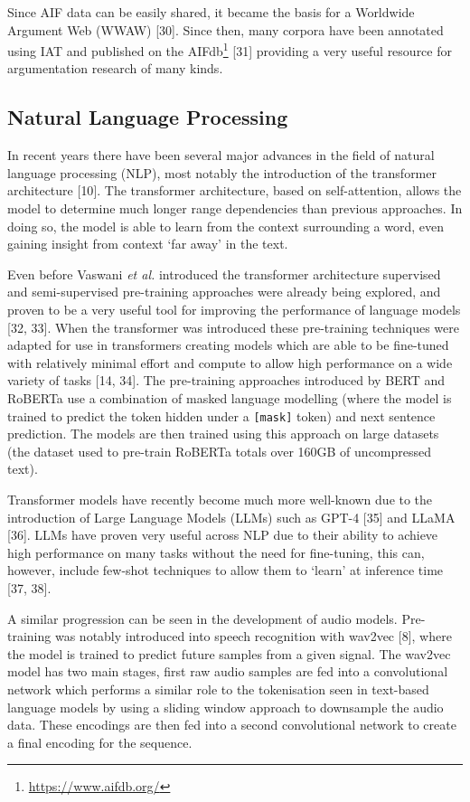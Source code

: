 \documentclass[twocolumn,twoside]{article}
\begin{document}
Since AIF data can be easily shared, it became the basis for a Worldwide
Argument Web (WWAW) {[}30{]}. Since then, many corpora have been
annotated using IAT and published on the AIFdb\footnote{\url{https://www.aifdb.org/}}
{[}31{]} providing a very useful resource for argumentation research of
many kinds.

\subsection{Natural Language Processing}\label{sec:background-ml}

In recent years there have been several major advances in the field of
natural language processing (NLP), most notably the introduction of the
transformer architecture {[}10{]}. The transformer architecture, based
on self-attention, allows the model to determine much longer range
dependencies than previous approaches. In doing so, the model is able to
learn from the context surrounding a word, even gaining insight from
context `far away' in the text.

Even before Vaswani \emph{et al.} introduced the transformer
architecture supervised and semi-supervised pre-training approaches were
already being explored, and proven to be a very useful tool for
improving the performance of language models {[}32, 33{]}. When
the transformer was introduced these pre-training techniques were
adapted for use in transformers creating models which are able to be
fine-tuned with relatively minimal effort and compute to allow high
performance on a wide variety of tasks {[}14, 34{]}. The
pre-training approaches introduced by BERT and RoBERTa use a combination
of masked language modelling (where the model is trained to predict the
token hidden under a \texttt{{[}mask{]}} token) and next sentence
prediction. The models are then trained using this approach on large
datasets (the dataset used to pre-train RoBERTa totals over 160GB of
uncompressed text).

Transformer models have recently become much more well-known due to the
introduction of Large Language Models (LLMs) such as GPT-4 {[}35{]} and
LLaMA {[}36{]}. LLMs have proven very useful across NLP due to their
ability to achieve high performance on many tasks without the need for
fine-tuning, this can, however, include few-shot techniques to allow
them to `learn' at inference time {[}37, 38{]}.

A similar progression can be seen in the development of audio models.
Pre-training was notably introduced into speech recognition with wav2vec
{[}8{]}, where the model is trained to predict future samples from a
given signal. The wav2vec model has two main stages, first raw audio
samples are fed into a convolutional network which performs a similar
role to the tokenisation seen in text-based language models by using a
sliding window approach to downsample the audio data. These encodings
are then fed into a second convolutional network to create a final
encoding for the sequence.
\end{document}
